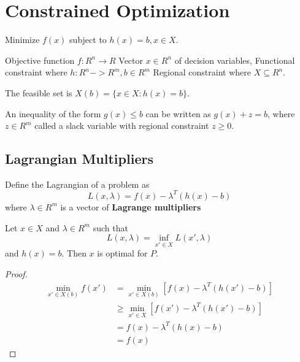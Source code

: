 
\chapter{Constrained Optimization}
\label{cha:constr-optim}

Minimize $f(x)$ subject to $h(x) = b, x \in X$.  

Objective function $f: R^{n} \rightarrow R$
Vector $x \in R^{n}$ of decision variables,
Functional constraint where $h: R^{n} -> R^{m}, b \in R^{m}$
Regional constraint where $X \subseteq R^{n}$.

\begin{defn}
  \label{defn:1}
  The feasible set is $X(b) = \{ x \in X : h(x) = b \}$.
\end{defn}

An inequality of the form $g(x) \leq b$ can be written as $g(x) + z =
b$, where $z \in R^{m}$ called a slack variable with regional
constraint $z \geq 0$.

\section{Lagrangian Multipliers}
\label{sec:lagr-mult}

\begin{defn}
  \label{defn:2}
  Define the Lagrangian of a problem  as
  \begin{equation}
    \label{eq:1}
    L(x, \lambda) = f(x) - \lambda^{T}(h(x) - b)
  \end{equation} where $\lambda \in R^{m}$ is a vector of
  \textbf{Lagrange multipliers}
\end{defn}

\begin{thm}
  Let $x \in X$ and $\lambda \in R^{m}$ such that
  \begin{equation}
    \label{eq:2}
    L(x, \lambda) = \inf_{x' \in X} L(x', \lambda)
  \end{equation} and $h(x) = b$.  Then $x$ is optimal for $P$.
\end{thm}

\begin{proof}
  \begin{align}
    \label{eq:3}
    \min_{x' \in X(b)} f(x') &= \min_{x' \in X(b)} [f(x) - \lambda^{T}(h(x') - b)] \\
                             &\geq \min_{x' \in X} [ f(x') - \lambda^{T}(h(x') - b)] \\
                             &= f(x) - \lambda^{T}(h(x) - b) \\
                             &= f(x)
  \end{align}
\end{proof}

